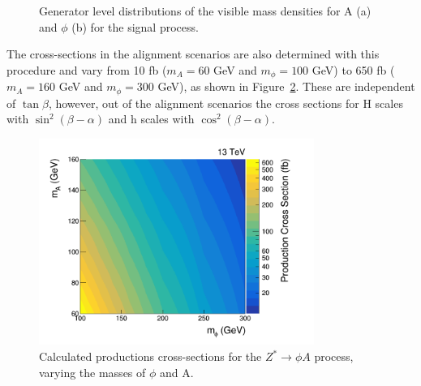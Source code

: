 \begin{figure}[!hbtp]
\centering
\caption[Plots of the signal $m_{\tau\tau}$ generator level distributions of $\phi$ and A.]{Generator level distributions of the visible mass densities for A (a) and $\phi$ (b) for the signal process.}
\label{fig:4tau_gen_dist}
\end{figure}

The cross-sections in the alignment scenarios are also determined with this procedure and vary from 10 fb ($m_{A}=60$ GeV and $m_{\phi}=100$ GeV) to 650 fb ($m_{A}=160$ GeV and $m_{\phi}=300$ GeV), as shown in Figure~\ref{fig:4tau_xs}.
These are independent of $\tan\beta$, however, out of the alignment scenarios the cross sections for H scales with $\sin^{2}(\beta-\alpha)$ and h scales with $\cos^{2}(\beta-\alpha)$. \\

\begin{figure}[!hbtp]
\centering
    \includegraphics[width=0.8\textwidth]{Figures/cross_sections.png}
\caption[Plot of the production cross-sections for the $Z^{*} \rightarrow \phi A$ process.]{Calculated productions cross-sections for the $Z^{*} \rightarrow \phi A$ process, varying the masses of $\phi$ and A.}
\label{fig:4tau_xs}
\end{figure}

